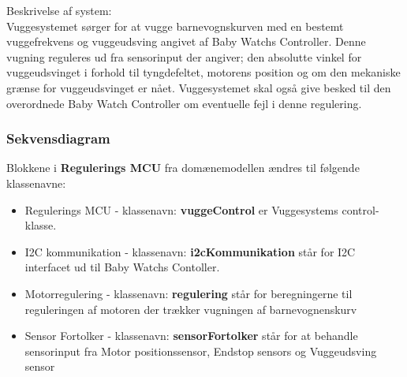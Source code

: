 Beskrivelse af system:\\
Vuggesystemet sørger for at vugge barnevognskurven med en bestemt vuggefrekvens og vuggeudsving angivet af Baby Watchs Controller. Denne vugning reguleres ud fra sensorinput der angiver; den absolutte vinkel for vuggeudsvinget i forhold til tyngdefeltet, motorens position og om den mekaniske grænse for vuggeudsvinget er nået. Vuggesystemet skal også give besked til den overordnede Baby Watch Controller om eventuelle fejl i denne regulering.


\subsubsection*{Sekvensdiagram}


Blokkene i \textbf{Regulerings MCU} fra domænemodellen ændres til følgende klassenavne: \\
\begin{itemize}
\item Regulerings MCU - klassenavn: \textbf{vuggeControl} er Vuggesystems control-klasse. 
\item I2C kommunikation - klassenavn: \textbf{i2cKommunikation} står for I2C interfacet ud til Baby Watchs Contoller.
\item Motorregulering - klassenavn: \textbf{regulering} står for beregningerne til reguleringen af motoren der trækker vugningen af barnevognenskurv
\item Sensor Fortolker - klassenavn: \textbf{sensorFortolker} står for at behandle sensorinput fra Motor positionssensor, Endstop sensors og Vuggeudsving sensor
\end{itemize}